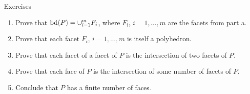 \begin{xcb}{Exercises}
\begin{enumerate}[label=\thechapter.\arabic*]
\begin{enumerate}[label=\alph*.]
\item Prove that $\operatorname{bd}(P) = \cup_{i=1}^m F_i$, where $F_i$, $i=1,\dots,m$
  are the facets from part a.

\item Prove that each facet $F_i$, $i=1,\dots,m$ is itself a polyhedron. 

\item Prove that each facet of a facet of $P$ is the intersection of two facets
  of $P$. 

\item Prove that each face of $P$ is the intersection of some number of facets
  of $P$. 

\item Conclude that $P$ has a finite number of faces. 
\end{enumerate}
\end{enumerate}
\end{xcb}